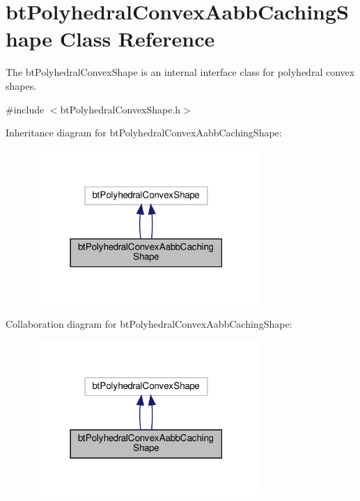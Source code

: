 \hypertarget{classbtPolyhedralConvexAabbCachingShape}{}\section{bt\+Polyhedral\+Convex\+Aabb\+Caching\+Shape Class Reference}
\label{classbtPolyhedralConvexAabbCachingShape}


The bt\+Polyhedral\+Convex\+Shape is an internal interface class for polyhedral convex shapes.  




{\ttfamily \#include $<$bt\+Polyhedral\+Convex\+Shape.\+h$>$}



Inheritance diagram for bt\+Polyhedral\+Convex\+Aabb\+Caching\+Shape\+:
\nopagebreak
\begin{figure}[H]
\begin{center}
\leavevmode
\includegraphics[width=243pt]{classbtPolyhedralConvexAabbCachingShape__inherit__graph}
\end{center}
\end{figure}


Collaboration diagram for bt\+Polyhedral\+Convex\+Aabb\+Caching\+Shape\+:
\nopagebreak
\begin{figure}[H]
\begin{center}
\leavevmode
\includegraphics[width=243pt]{classbtPolyhedralConvexAabbCachingShape__coll__graph}
\end{center}
\end{figure}
